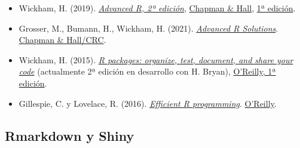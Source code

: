 \documentclass[
]{book}
\theoremstyle{break}
\theoremstyle{nonumberplain}
\begin{document}
\begin{itemize}
\item
  Wickham, H. (2019). \emph{\href{https://adv-r.hadley.nz/}{Advanced R, 2ª edición}}, \href{https://www.amazon.com/dp/0815384572}{Chapman \& Hall}, \href{http://adv-r.had.co.nz/}{1ª edición}.
\item
  Grosser, M., Bumann, H., Wickham, H. (2021). \emph{\href{https://advanced-r-solutions.rbind.io/}{Advanced R Solutions}}. \href{https://www.routledge.com/p/book/9781032007496}{Chapman \& Hall/CRC}.
\item
  Wickham, H. (2015). \emph{\href{http://r-pkgs.had.co.nz/}{R packages: organize, test, document, and share your code}} (actualmente 2ª edición en desarrollo con H. Bryan), \href{http://shop.oreilly.com/product/0636920034421.do}{O'Reilly, 1ª edición}.
\item
  Gillespie, C. y Lovelace, R. (2016). \emph{\href{https://bookdown.org/csgillespie/efficientR/}{Efficient R programming}}. \href{https://www.oreilly.com/library/view/efficient-r-programming/9781491950777/}{O'Reilly}.
\end{itemize}

\subsection*{Rmarkdown y Shiny}\label{rmarkdown-y-shiny}
\end{document}
